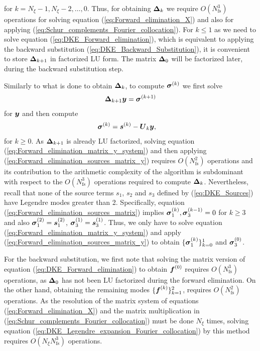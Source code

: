 for $k=N_\xi-1, N_\xi-2, \ldots, 0$. Thus, for obtaining $\vb*{\Delta}_k$ we require $O(N_{\text{fs}}^3)$ operations for solving equation (\ref{eq:Forward_elimination_X}) and also for applying (\ref{eq:Schur_complements_Fourier_collocation}). For $k\le 1$ as we need to solve equation (\ref{eq:DKE_Forward_elimination}), which is equivalent to applying the backward substitution (\ref{eq:DKE_Backward_Substitution}), it is convenient to store $\vb*{\Delta}_{k+1}$ in factorized LU form. The matrix $\vb*{\Delta}_{0}$ will be factorized later, during the backward substitution step.
	
Similarly to what is done to obtain $\vb*{\Delta}_k$, to compute $\vb*{\sigma}^{(k)}$ we first solve 
%
\begin{align}
	\vb*{\Delta}_{k+1} \vb*{y} = \vb*{\sigma}^{(k+1)}
	\label{eq:Forward_elimination_matrix_y_system}
\end{align}
for $\vb*{y}$ and then compute
%
\begin{align}
	\vb*{\sigma}^{(k)} & = \vb*{s}^{(k)} - \vb*{U}_{k}  \vb*{y},
	\label{eq:Forward_elimination_sources_matrix_y}
\end{align}
%
for $k\ge 0$. As $\vb*{\Delta}_{k+1}$ is already LU factorized, solving equation (\ref{eq:Forward_elimination_matrix_y_system}) and then applying (\ref{eq:Forward_elimination_sources_matrix_y}) requires $O(N_{\text{fs}}^2)$ operations and its contribution to the arithmetic complexity of the algorithm is subdominant with respect to the $O(N_{\text{fs}}^3)$ operations required to compute $\vb*{\Delta}_k$. Nevertheless, recall that none of the source terms $s_1$, $s_2$ and $s_3$ defined by (\ref{eq:DKE_Sources}) have Legendre modes greater than 2. Specifically, equation (\ref{eq:Forward_elimination_sources_matrix}) implies $\vb*{\sigma}_1^{(k)}, \vb*{\sigma}_3^{(k-1)} = 0$ for $k\ge 3$ and also $\vb*{\sigma}_1^{(2)} = \vb*{s}_1^{(2)}$, $\vb*{\sigma}_3^{(1)} = \vb*{s}_3^{(1)}$. Thus, we only have to solve equation (\ref{eq:Forward_elimination_matrix_y_system}) and apply (\ref{eq:Forward_elimination_sources_matrix_y}) to obtain $\{\vb*{\sigma}_1^{(k)}\}_{k=0}^{1}$ and $\vb*{\sigma}_3^{(0)}$.

For the backward substitution, we first note that solving the matrix version of equation (\ref{eq:DKE_Forward_elimination}) to obtain $\vb*{f}^{(0)}$ requires $O(N_{\text{fs}}^3)$ operations, as $\vb*{\Delta}_0$ has not been LU factorized during the forward elimination. On the other hand, obtaining the remaining modes  $\{\vb*{f}^{(k)}\}_{k=1}^{2}$, requires $O(N_{\text{fs}}^2)$ operations. As the resolution of the matrix system of equations (\ref{eq:Forward_elimination_X}) and the matrix multiplication in (\ref{eq:Schur_complements_Fourier_collocation}) must be done $N_\xi$ times, solving equation (\ref{eq:DKE_Legendre_expansion_Fourier_collocation}) by this method requires $O(N_\xi N_{\text{fs}}^3)$ operations. 

